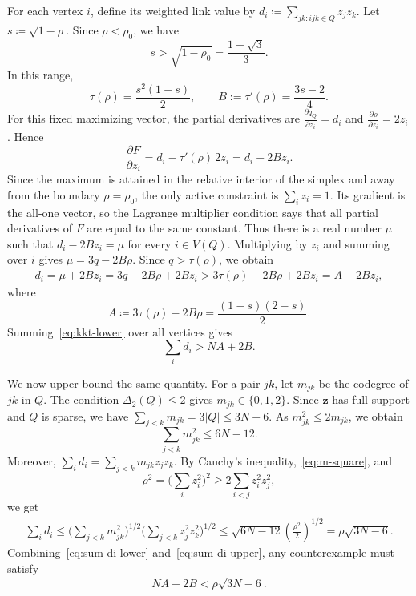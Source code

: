 \documentclass[10pt]{article}
\numberwithin{equation}{section}
\theoremstyle{definition}
\theoremstyle{remark}
\begin{document}
For each vertex $i$, define its weighted link value by $d_i \coloneqq \sum_{jk:ijk\in Q}z_jz_k$. Let $s \coloneqq \sqrt{1-\rho}$. Since $\rho<\rho_0$, we have
\begin{equation}\label{eq:s-range}
        s>\sqrt{1-\rho_0}=\frac{1+\sqrt3}{3}.
\end{equation}
In this range,
\[
        \tau(\rho)=\frac{s^2(1-s)}2,
        \qquad
        B:=\tau'(\rho)=\frac{3s-2}{4}.
\]
For this fixed maximizing vector, the partial derivatives are $\frac{\partial q_Q}{\partial z_i}=d_i$ and $\frac{\partial \rho}{\partial z_i}=2z_i$. Hence
\[
        \frac{\partial F}{\partial z_i}
        =d_i-\tau'(\rho)\,2z_i
        =d_i-2Bz_i.
\]
Since the maximum is attained in the relative interior of the simplex and away from the boundary $\rho=\rho_0$, the only active constraint is $\sum_i z_i=1$. Its gradient is the all-one vector, so the Lagrange multiplier condition says that all partial derivatives of $F$ are equal to the same constant. Thus there is a real number $\mu$ such that $d_i-2Bz_i=\mu$ for every $i\in V(Q)$. Multiplying by $z_i$ and summing over $i$ gives $\mu=3q-2B\rho$. Since $q>\tau(\rho)$, we obtain
\begin{equation}\label{eq:kkt-lower}
\begin{aligned}
        d_i
        =\mu+2Bz_i
        =3q-2B\rho+2Bz_i 
        >3\tau(\rho)-2B\rho+2Bz_i
        =A+2Bz_i,
\end{aligned}
\end{equation}
where
\[
        A
        \coloneqq 3\tau(\rho)-2B\rho
        = \frac{(1-s)(2-s)}2.
\]
Summing~\eqref{eq:kkt-lower} over all vertices gives
\begin{equation}\label{eq:sum-di-lower}
        \sum_i d_i>NA+2B.
\end{equation}

We now upper-bound the same quantity. For a pair $jk$, let $m_{jk}$ be the codegree of $jk$ in $Q$. The condition $\Delta_2(Q)\le2$ gives $m_{jk}\in\{0,1,2\}$. Since $\mathbf{z}$ has full support and $Q$ is sparse, we have $\sum_{j<k}m_{jk}=3|Q|\le3N-6$. As $m_{jk}^2\le2m_{jk}$, we obtain
\begin{equation}\label{eq:m-square}
        \sum_{j<k}m_{jk}^2\le6N-12.
\end{equation}
Moreover, $\sum_i d_i=\sum_{j<k}m_{jk}z_jz_k$. By Cauchy's inequality,~\eqref{eq:m-square}, and
\[
        \rho^2
        = \Big(\sum_i z_i^2\Big)^2
        \ge 2\sum_{i<j}z_i^2z_j^2,
\]
we get
\begin{align}
        \sum_i d_i
        \le
        \Big( \sum_{j<k}m_{jk}^2 \Big)^{1/2}
        \Big( \sum_{j<k}z_j^2z_k^2 \Big)^{1/2} 
        \le \sqrt{6N-12}\left(\frac{\rho^2}{2}\right)^{1/2}
        =\rho\sqrt{3N-6}.
\label{eq:sum-di-upper}
\end{align}
Combining~\eqref{eq:sum-di-lower} and~\eqref{eq:sum-di-upper}, any counterexample must satisfy
\begin{equation}\label{eq:necessary-counter}
        NA+2B<\rho\sqrt{3N-6}.
\end{equation}
\end{document}
